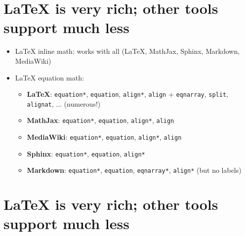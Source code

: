 \documentclass[%
twoside,                 %
final,                   %
chapterprefix=true,      %
open=right               %
10pt]{book}
\begin{document}
\noindent


\section*{{\LaTeX} is very rich; other tools support much less}

\begin{itemize}
 \item {\LaTeX} inline math: works with all ({\LaTeX}, MathJax, Sphinx, Markdown, MediaWiki)

 \item {\LaTeX} equation math:
\begin{itemize}

    \item \textbf{LaTeX}: \Verb!equation*!, \Verb!equation!, \Verb!align*!, \Verb!align! +
      \Verb!eqnarray!, \Verb!split!, \Verb!alignat!, ... (numerous!)

    \item \textbf{MathJax}: \Verb!equation*!, \Verb!equation!, \Verb!align*!, \Verb!align!

    \item \textbf{MediaWiki}: \Verb!equation*!, \Verb!equation!, \Verb!align*!, \Verb!align!

    \item \textbf{Sphinx}: \Verb!equation*!, \Verb!equation!, \Verb!align*!

    \item \textbf{Markdown}: \Verb!equation*!, \Verb!equation!, \Verb!eqnarray*!, \Verb!align*! (but no labels)
\end{itemize}

\noindent
\end{itemize}

\noindent
\section*{{\LaTeX} is very rich; other tools support much less}
\end{document}
